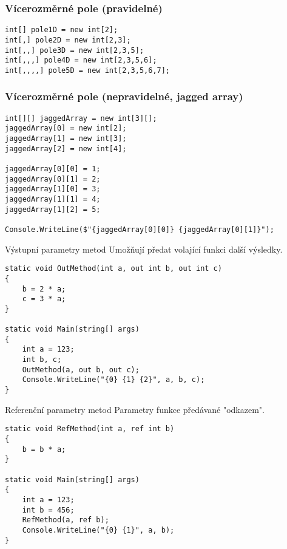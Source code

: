 \begin{frame}[fragile]
\frametitle{Vícerozměrné pole (pravidelné)}
\begin{yesblock}
\begin{lstlisting}
int[] pole1D = new int[2];
int[,] pole2D = new int[2,3];
int[,,] pole3D = new int[2,3,5];
int[,,,] pole4D = new int[2,3,5,6];
int[,,,,] pole5D = new int[2,3,5,6,7];
\end{lstlisting}
\end{yesblock}
\end{frame}



\begin{frame}[fragile]
\frametitle{Vícerozměrné pole (nepravidelné, jagged array)}
\begin{yesblock}
\begin{lstlisting}
int[][] jaggedArray = new int[3][];
jaggedArray[0] = new int[2];
jaggedArray[1] = new int[3];
jaggedArray[2] = new int[4];

jaggedArray[0][0] = 1;
jaggedArray[0][1] = 2;
jaggedArray[1][0] = 3;
jaggedArray[1][1] = 4;
jaggedArray[1][2] = 5;

Console.WriteLine($"{jaggedArray[0][0]} {jaggedArray[0][1]}");
\end{lstlisting}
\end{yesblock}
\end{frame}







\begin{frame}[fragile]
\begin{block}{Výstupní parametry metod}
Umožňují předat volající funkci další výsledky.
\end{block}

\begin{yesblock}
\begin{lstlisting}
static void OutMethod(int a, out int b, out int c)
{
    b = 2 * a;
    c = 3 * a;
}

static void Main(string[] args)
{
    int a = 123;
    int b, c;
    OutMethod(a, out b, out c);
    Console.WriteLine("{0} {1} {2}", a, b, c);
}
\end{lstlisting}
\end{yesblock}
\end{frame}


\begin{frame}[fragile]
\begin{block}{Referenční parametry metod}
Parametry funkce předávané "odkazem".
\end{block}

\begin{yesblock}
\begin{lstlisting}
static void RefMethod(int a, ref int b)
{
    b = b * a;
}

static void Main(string[] args)
{
    int a = 123;
    int b = 456;
    RefMethod(a, ref b);
    Console.WriteLine("{0} {1}", a, b);
}
\end{lstlisting}
\end{yesblock}
\end{frame}



